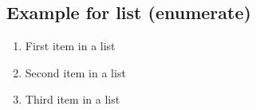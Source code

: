 \documentclass[11pt,english]{article}
\numberwithin{equation}{section}		%
\numberwithin{figure}{section}			%
\numberwithin{table}{section}				%
\begin{document}
\subsection{Example for list (enumerate)}
\begin{enumerate}
	\item First item in a list 
	\item Second item in a list 
	\item Third item in a list
\end{enumerate}

\newpage
\listoffigures

\newpage
\listoftables


\newpage



\end{document}
